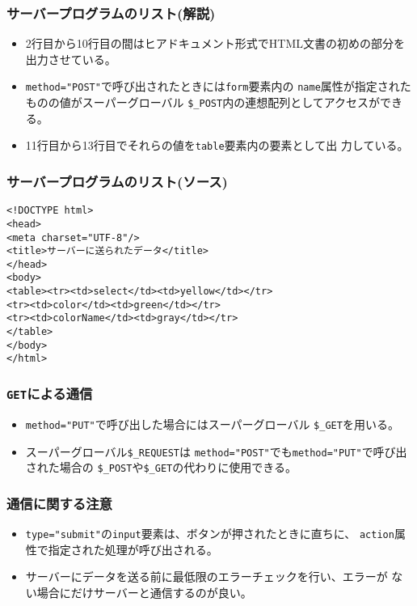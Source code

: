 \begin{frame}[containsverbatim]
\frametitle{サーバープログラムのリスト(解説)}
\begin{itemize}
 \item 2行目から10行目の間はヒアドキュメント形式でHTML文書の初めの部分を
       出力させている。
 \item \verb+method="POST"+で呼び出されたときには\texttt{form}要素内の
       \texttt{name}属性が指定されたものの値がスーパーグローバル
       \verb+$_POST+内の連想配列としてアクセスができる。
 \item 11行目から13行目でそれらの値を\texttt{table}要素内の要素として出
       力している。
\end{itemize}
\end{frame}
\begin{frame}[containsverbatim]
\frametitle{サーバープログラムのリスト(ソース)}
\begin{Verbatim}
<!DOCTYPE html>
<head>
<meta charset="UTF-8"/>
<title>サーバーに送られたデータ</title>
</head>
<body>
<table><tr><td>select</td><td>yellow</td></tr>
<tr><td>color</td><td>green</td></tr>
<tr><td>colorName</td><td>gray</td></tr>
</table>
</body>
</html>
\end{Verbatim}
\end{frame}
\begin{frame}[containsverbatim]
\frametitle{\texttt{GET}による通信}
\begin{itemize}
 \item \Verb+method="PUT"+で呼び出した場合にはスーパーグローバル
\Verb+$_GET+を用いる。
 \item スーパーグローバル\Verb+$_REQUEST+は
\Verb+method="POST"+でも\Verb+method="PUT"+で呼び出された場合の
\Verb+$_POST+や\Verb+$_GET+の代わりに使用できる。
\end{itemize}
\end{frame}
\begin{frame}[containsverbatim]
\frametitle{通信に関する注意}
\begin{itemize}
 \item \Verb+type="submit"+の\texttt{input}要素は、ボタンが押されたときに直ちに、
\texttt{action}属性で指定された処理が呼び出される。
 \item サーバーにデータを送る前に最低限のエラーチェックを行い、エラーが
       ない場合にだけサーバーと通信するのが良い。
\end{itemize}
\end{frame}
